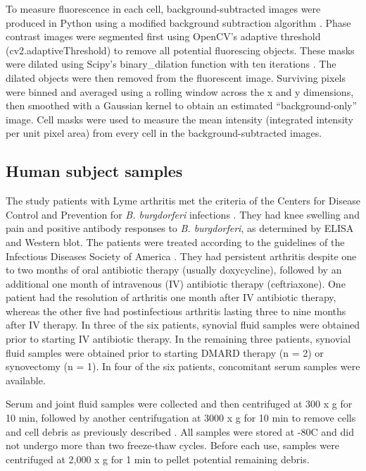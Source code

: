 \documentclass[twoside, watermark]{zHenriquesLab-StyleBioRxiv}
\begin{document}
\vspace{1mm}
To measure fluorescence in each cell, background-subtracted images were produced in Python using a modified background subtraction algorithm \cite{Makela2024}. Phase contrast images were segmented first using OpenCV’s adaptive threshold (cv2.adaptiveThreshold) to remove all potential fluorescing objects. These masks were dilated using Scipy’s binary\_dilation function with ten iterations \cite{Virtanen2020}. The dilated objects were then removed from the fluorescent image. Surviving pixels were binned and averaged using a rolling window across the x and y dimensions, then smoothed with a Gaussian kernel to obtain an estimated “background-only” image. Cell masks were used to measure the mean intensity (integrated intensity per unit pixel area) from every cell in the background-subtracted images.

\subsection*{Human subject samples}
The study patients with Lyme arthritis met the criteria of the Centers for Disease Control and Prevention for \textit{B. burgdorferi} infections \cite{Wharton1990}. They had knee swelling and pain and positive antibody responses to \textit{B. burgdorferi}, as determined by ELISA and Western blot. The patients were treated according to the guidelines of the Infectious Diseases Society of America \cite{Lantos2021}. They had persistent arthritis despite one to two months of oral antibiotic therapy (usually doxycycline), followed by an additional one month of intravenous (IV) antibiotic therapy (ceftriaxone). One patient had the resolution of arthritis one month after IV antibiotic therapy, whereas the other five had postinfectious arthritis lasting three to nine months after IV therapy. In three of the six patients, synovial fluid samples were obtained prior to starting IV antibiotic therapy. In the remaining three patients, synovial fluid samples were obtained prior to starting DMARD therapy (n = 2) or synovectomy (n = 1). In four of the six patients, concomitant serum samples were available.  

\vspace{1mm}
Serum and joint fluid samples were collected and then centrifuged at 300 x g for 10 min, followed by another centrifugation at 3000 x g for 10 min to remove cells and cell debris as previously described \cite{Lochhead2017}. All samples were stored at -80\degree C and did not undergo more than two freeze-thaw cycles. Before each use, samples were centrifuged at 2,000 x g for 1 min to pellet potential remaining debris.
\end{document}
